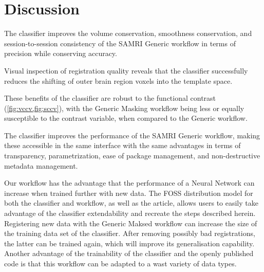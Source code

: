 \section{Discussion}

The classifier improves the volume conservation, smoothness conservation, and session-to-session consistency of the
SAMRI Generic workflow in terms of precision while conserving accuracy.

Visual inspection of registration quality reveals that the classifier successfully reduces the shifting of outer brain
region voxels into the template space.


These benefits of the classifier are robust to the functional contrast (\cref{fig:vccv,fig:sccv}), with the Generic Masking workflow being less or equally susceptible to the contrast variable, when compared to the Generic workflow.

The classifier improves the performance of the SAMRI Generic workflow, making these accessible in the same interface
with the same advantages in terms of transparency, parametrization, ease of package management, and non-destructive
metadata management.

Our workflow has the advantage that the performance of a Neural Network can increase when trained further with new data.
The FOSS distribution model for both the classifier and workflow, as well as the article, allows users to easily take advantage of the classifier extendability and recreate the steps described herein.
Registering new data with the Generic Maksed workflow can increase the size of the training data set of the classifier.
After removing possibly bad registrations, the latter can be trained again, which will improve its generalisation capability.
Another advantage of the trainability of the classifier and the openly published code is that this workflow can be adapted to a wast variety of data types.

